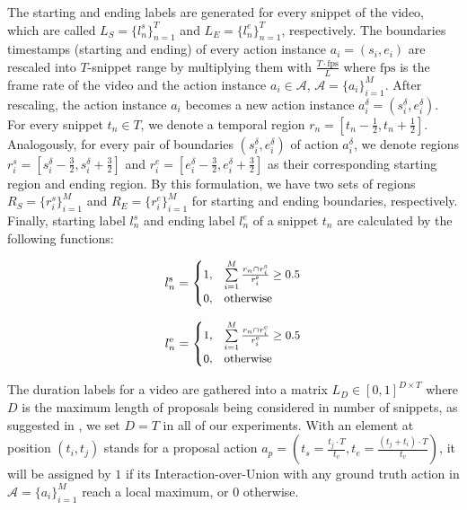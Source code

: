 \documentclass{ieeeaccess}
\begin{document}
The starting and ending labels are generated for every snippet of the video, which are called $L_S=\{l^s_n\}_{n=1}^T$ and $L_E=\{l^e_n\}_{n=1}^T$, respectively. The boundaries timestamps (starting and ending) of every action instance $a_i=(s_i, e_i)$ are rescaled into $T$-snippet range by multiplying them with $\frac{T \cdot \text{fps}}{L}$ where $\text{fps}$ is the frame rate of the video and the action instance $a_i \in \mathcal{A}$,  $\mathcal{A}=\{a_i\}_{i=1}^{M}$. After rescaling, the action instance $a_i$ becomes a new action instance $a^\delta_i=(s_i^\delta, e_i^\delta)$. For every snippet $t_n \in T$, we denote a temporal region $r_{n}=[t_n-\frac{1}{2},t_n+\frac{1}{2}]$. Analogously, for every pair of boundaries $(s_i^\delta, e_i^\delta)$ of action $a_i^\delta$, we denote regions $r^s_i=[s_i^\delta-\frac{3}{2}, s_i^\delta+\frac{3}{2}]$ and $r^e_i=[e_i^\delta-\frac{3}{2}, e_i^\delta+\frac{3}{2}]$ as their corresponding starting region and ending region. By this formulation, we have two sets of regions $R_S=\{r^s_i\}^M_{i=1}$ and $R_E=\{r^e_i\}^M_{i=1}$ for starting and ending boundaries, respectively. Finally, starting label $l^s_n$ and ending label $l^e_n$ of a snippet $t_n$ are calculated by the following functions:

\begin{multicols}{2}
\begin{equation}
\small
\nonumber
l^{\text{s}}_{n} = 
\begin{cases}
1,& \sum\limits^{M}_{i=1} \frac{r_{n} \cap r_i^{\text{s}}}{r_i^{\text{s}}} \geq 0.5
\\
0,              & \text{otherwise}
\end{cases}
\end{equation}

\begin{equation}
\small
\nonumber
    l^{\text{e}}_{n} = 
\begin{cases}
    1,&  \sum\limits^{M}_{i=1} \frac{r_{n} \cap r_i^{\text{e}}}{r_i^{\text{e}}} \geq 0.5 \\
    0,              & \text{otherwise}
\end{cases}
\end{equation}
\end{multicols}

The duration labels for a video are gathered into a matrix $L_D \in [0, 1]^{D \times T}$ where $D$ is the maximum length of proposals being considered in number of snippets, as suggested in \cite{bmn}, we set $D=T$ in all of our experiments. With an element at position $(t_i, t_j)$ stands for a proposal action $a_p=(t_s=\frac{t_j\cdot T}{t_v}, t_e=\frac{(t_j+t_i)\cdot T}{t_v})$, it will be assigned by $1$ if its Interaction-over-Union with any ground truth action in $\mathcal{A}=\{a_i\}_{i=1}^{M}$ reach a local maximum, or $0$ otherwise.
\end{document}
